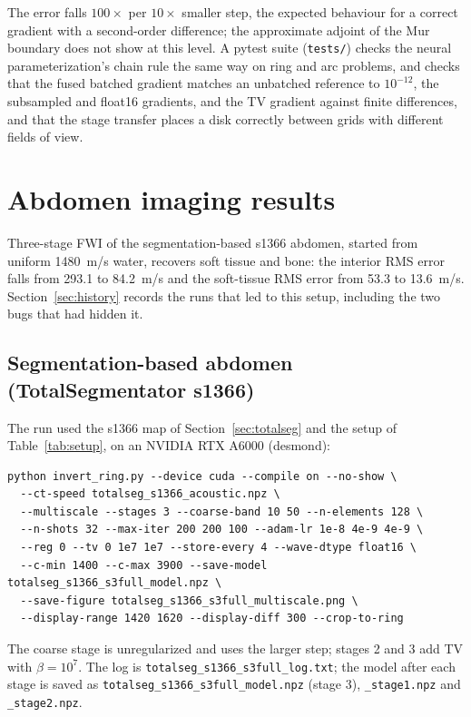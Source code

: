 \documentclass[11pt]{article}
\newcommand{\code}[1]{\texttt{#1}}
\begin{document}
The error falls $100\times$ per $10\times$ smaller step, the expected behaviour
for a correct gradient with a second-order difference; the approximate adjoint
of the Mur boundary does not show at this level. A pytest suite
(\code{tests/}) checks the neural parameterization's chain rule the same way on
ring and arc problems, and checks that the fused batched gradient matches an
unbatched reference to $10^{-12}$, the subsampled and float16 gradients, and the
TV gradient against finite differences, and that the stage transfer places
a disk correctly between grids with different fields of view.

\section{Abdomen imaging results}
\label{sec:results}

Three-stage FWI of the segmentation-based s1366 abdomen, started from uniform
1480~m/s water, recovers soft tissue and bone: the interior RMS error falls
from 293.1 to 84.2~m/s and the soft-tissue RMS error from 53.3 to 13.6~m/s.
Section~\ref{sec:history} records the runs that led to this setup, including
the two bugs that had hidden it.

\subsection{Segmentation-based abdomen (TotalSegmentator s1366)}
\label{sec:s1366}

The run used the s1366 map of Section~\ref{sec:totalseg} and the setup of
Table~\ref{tab:setup}, on an NVIDIA RTX A6000 (desmond):
\begin{verbatim}
python invert_ring.py --device cuda --compile on --no-show \
  --ct-speed totalseg_s1366_acoustic.npz \
  --multiscale --stages 3 --coarse-band 10 50 --n-elements 128 \
  --n-shots 32 --max-iter 200 200 100 --adam-lr 1e-8 4e-9 4e-9 \
  --reg 0 --tv 0 1e7 1e7 --store-every 4 --wave-dtype float16 \
  --c-min 1400 --c-max 3900 --save-model totalseg_s1366_s3full_model.npz \
  --save-figure totalseg_s1366_s3full_multiscale.png \
  --display-range 1420 1620 --display-diff 300 --crop-to-ring
\end{verbatim}
The coarse stage is unregularized and uses the larger step; stages 2 and 3 add
TV with $\beta = 10^{7}$. The log is \code{totalseg\_s1366\_s3full\_log.txt};
the model after each stage is saved as \code{totalseg\_s1366\_s3full\_model.npz}
(stage 3), \code{\_stage1.npz} and \code{\_stage2.npz}.
\end{document}
